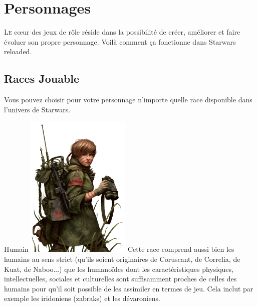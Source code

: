 
\section{Personnages}
\lettrine{L}{e} c\oe{}ur des jeux de rôle réside dans la possibilité de créer, améliorer et faire évoluer son propre personnage. Voilà comment ça fonctionne dans {\jedifont Starwars reloaded}. 

\subsection{Races Jouable}
Vous pouvez choisir pour votre personnage n’importe quelle race disponible dans l'univers de Starwars. 

\begin{monsterbox}{Humain}
	\includegraphics[width=5cm]{img/races/humain.png}
	\hline
	\basics[%
		type = Humain,
		planet = Terre,
		language = Basic
	]
	\hline
	\traits
	\stats
	\hline
	Cette race comprend aussi bien les humains au sens strict (qu’ils soient originaires de Coruscant, de Correlia, de Kuat, de Naboo...) que les humanoïdes dont les caractéristiques physiques, intellectuelles, sociales et culturelles sont suffisamment proches de celles des humains pour qu’il soit possible de les assimiler en termes de jeu. Cela inclut par exemple les iridoniens (zabraks) et les dévaroniens.
\end{monsterbox}

